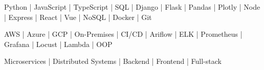 

\begin{cvparagraph}

\begin{cventries}
{
    \begin{cvitems}
        \item {Python | JavaScript | TypeScript | SQL | Django | Flask | Pandas | Plotly | Node | Express | React | Vue | NoSQL | Docker | Git }
        \item {AWS | Azure | GCP | On-Premises | CI/CD | Ariflow | ELK | Prometheus | Grafana | Locust | Lambda | OOP }
        \item {Microservices | Distributed Systems | Backend | Frontend | Full-stack}
    \end{cvitems}
}
\end{cventries}

\end{cvparagraph}
